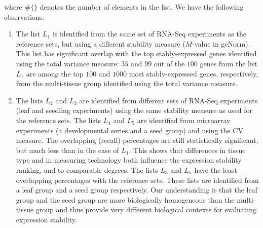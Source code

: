\documentclass[11pt, a4paper]{article}
\begin{document}
where $\#\{ \}$ denotes the number of elements in the list.
We have the following observations:
\begin{enumerate}
    \item
	The list $L_1$ is identified from the same set of RNA-Seq experiments as the
	reference sets, but using a different stability measure ($M$-value in
	geNorm). This list has significant overlap with the top
	stably-expressed genes identified using the total variance measure:
	$35$ and $99$ out of the $100$ genes from the list $L_1$ are among the
	top $100$ and $1000$ most stably-expressed genes, respectively, from the
	multi-tissue group identified using the total variance measure. 
    \item
	The lists $L_2$ and $L_3$ are identified from different sets of
	RNA-Seq experiments (leaf and seedling experiments) using the same
	stability measure as used for the reference sets. The lists $L_4$ and $L_5$ are
	identified from microarray experiments (a developmental series and a
	seed group) and using the CV measure. The overlapping (recall)
	percentages are still statistically significant, but much less than in
	the case of $L_1$.  This shows that differences in tissue type and in
	measuring technology both influence the expression stability ranking,
	and to comparable degrees. The lists $L_3$ and $L_5$ have the least
	overlapping percentages with the reference sets. These lists are
	identified from a leaf group and a seed group respectively.
	Our understanding is that the leaf group and the seed group are more
	biologically homogeneous than the multi-tissue group and thus provide
	very different biological contexts for evaluating expression stability.
\end{enumerate}


\end{document}
